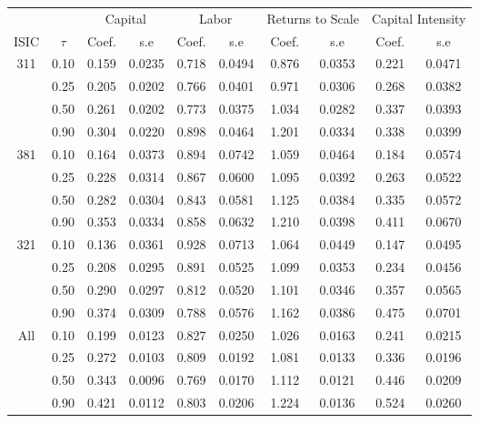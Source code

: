 \begin{table}[H]
\centering
\begin{tabular}{cccccccccc}
  \hline\hline & & \multicolumn{2}{c}{Capital}  & \multicolumn{2}{c}{Labor} & \multicolumn{2}{c}{Returns to Scale} & \multicolumn{2}{c}{Capital Intensity}\\ \cmidrule(lr){3-4} \cmidrule(lr){5-6} \cmidrule(lr){7-8} \cmidrule(lr){9-10}ISIC & $\tau$ & Coef. & s.e & Coef. & s.e & Coef. & s.e & Coef. & s.e \\ 
  \hline
311 & 0.10 & 0.159 & 0.0235 & 0.718 & 0.0494 & 0.876 & 0.0353 & 0.221 & 0.0471 \\ 
   & 0.25 & 0.205 & 0.0202 & 0.766 & 0.0401 & 0.971 & 0.0306 & 0.268 & 0.0382 \\ 
   & 0.50 & 0.261 & 0.0202 & 0.773 & 0.0375 & 1.034 & 0.0282 & 0.337 & 0.0393 \\ 
   & 0.90 & 0.304 & 0.0220 & 0.898 & 0.0464 & 1.201 & 0.0334 & 0.338 & 0.0399 \\ 
  381 & 0.10 & 0.164 & 0.0373 & 0.894 & 0.0742 & 1.059 & 0.0464 & 0.184 & 0.0574 \\ 
   & 0.25 & 0.228 & 0.0314 & 0.867 & 0.0600 & 1.095 & 0.0392 & 0.263 & 0.0522 \\ 
   & 0.50 & 0.282 & 0.0304 & 0.843 & 0.0581 & 1.125 & 0.0384 & 0.335 & 0.0572 \\ 
   & 0.90 & 0.353 & 0.0334 & 0.858 & 0.0632 & 1.210 & 0.0398 & 0.411 & 0.0670 \\ 
  321 & 0.10 & 0.136 & 0.0361 & 0.928 & 0.0713 & 1.064 & 0.0449 & 0.147 & 0.0495 \\ 
   & 0.25 & 0.208 & 0.0295 & 0.891 & 0.0525 & 1.099 & 0.0353 & 0.234 & 0.0456 \\ 
   & 0.50 & 0.290 & 0.0297 & 0.812 & 0.0520 & 1.101 & 0.0346 & 0.357 & 0.0565 \\ 
   & 0.90 & 0.374 & 0.0309 & 0.788 & 0.0576 & 1.162 & 0.0386 & 0.475 & 0.0701 \\ 
  All & 0.10 & 0.199 & 0.0123 & 0.827 & 0.0250 & 1.026 & 0.0163 & 0.241 & 0.0215 \\ 
   & 0.25 & 0.272 & 0.0103 & 0.809 & 0.0192 & 1.081 & 0.0133 & 0.336 & 0.0196 \\ 
   & 0.50 & 0.343 & 0.0096 & 0.769 & 0.0170 & 1.112 & 0.0121 & 0.446 & 0.0209 \\ 
   & 0.90 & 0.421 & 0.0112 & 0.803 & 0.0206 & 1.224 & 0.0136 & 0.524 & 0.0260 \\ 
   \hline
\end{tabular}
\end{table}
